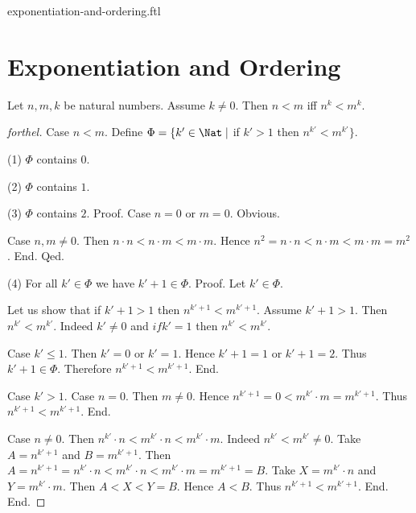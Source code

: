 \documentclass{naproche-library}
\begin{document}
\begin{smodule}{exponentiation-and-ordering.ftl}

  \section*{Exponentiation and Ordering}

  \begin{proposition}[forthel,id=ARITHMETIC_09_3373702288769024]
    Let $n, m, k$ be natural numbers.
    Assume $k \neq 0$.
    Then $n < m$ iff $n^{k} < m^{k}$.
  \end{proposition}
  \begin{proof}[forthel]
    Case $n < m$.
      Define $\Phi = \{ k' \in \Nat \mid$ if $k' > 1$ then $n^{k'} < m^{k'} \}$.

      (1) $\Phi$ contains $0$.

      (2) $\Phi$ contains $1$.

      (3) $\Phi$ contains $2$. \newline
      Proof.
        Case $n = 0$ or $m = 0$. Obvious.

        Case $n, m \neq 0$.
          Then $n \cdot n
            < n \cdot m
            < m \cdot m$.
          Hence $n^{2}
            = n \cdot n
            < n \cdot m
            < m \cdot m
            = m^{2}$.
        End.
      Qed.

      (4) For all $k' \in \Phi$ we have $k' + 1 \in \Phi$. \newline
      Proof.
        Let $k' \in \Phi$.

        Let us show that if $k' + 1 > 1$ then $n^{k' + 1} < m^{k' + 1}$.
          Assume $k' + 1 > 1$.
          Then $n^{k'} < m^{k'}$.
          Indeed $k' \neq 0$ and $if k' = 1$ then $n^{k'} < m^{k'}$.

          Case $k' \leq 1$.
            Then $k' = 0$ or $k' = 1$.
            Hence $k' + 1 = 1$ or $k' + 1 = 2$.
            Thus $k' + 1 \in \Phi$.
            Therefore $n^{k' + 1} < m^{k' + 1}$.
          End.

          Case $k' > 1$.
            Case $n = 0$.
              Then $m \neq 0$.
              Hence $n^{k' + 1}
                = 0
                < m^{k'} \cdot m
                = m^{k' + 1}$.
              Thus $n^{k' + 1} < m^{k' + 1}$.
            End.

            Case $n \neq 0$.
              Then $n^{k'} \cdot n
                < m^{k'} \cdot n
                < m^{k'} \cdot m$.
              Indeed $n^{k'} < m^{k'} \neq 0$.
              Take $A = n^{k' + 1}$ and $B = m^{k' + 1}$. %
              Then $A
                = n^{k' + 1}
                = n^{k'} \cdot n
                < m^{k'} \cdot n
                < m^{k'} \cdot m
                = m^{k' + 1}
                = B$.
              Take $X = m^{k'} \cdot n$ and $Y = m^{k'} \cdot m$.
              Then $A < X < Y = B$.
              Hence $A < B$.
              Thus $n^{k' + 1} < m^{k' + 1}$.
            End.
          End.


\end{proof}
\end{smodule}
\end{document}
